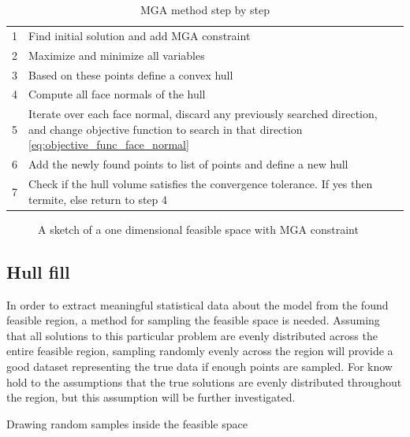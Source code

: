 \begin{table}[h]
	\caption{MGA method step by step}
	\label{tab:MGA_steps}
	\begin{tabular}{ll}
		1 & Find initial solution and add MGA constraint \\
		2 & Maximize and minimize all variables \\
		3 & Based on these points define a convex hull \\
		4 & Compute all face normals of the hull \\
		5 &  Iterate over each face normal, discard any previously searched direction, and change objective function to search in that direction \vref{eq:objective_func_face_normal} \\
		6 & Add the newly found points to list of points and define a new hull \\
		7 & Check if the hull volume satisfies the convergence tolerance. If yes then termite, else return to step 4 \\
	\end{tabular}
\end{table}


\begin{figure}[]
	\centering
	\caption{A sketch of a one dimensional feasible space with MGA constraint }
	\label{fig:step_by_step}
	\clearpage
\end{figure}





\subsection{Hull fill}

In order to extract meaningful statistical data about the model from the found feasible region, a method for sampling the feasible space is needed. Assuming that all solutions to this particular problem are evenly distributed across the entire feasible region, sampling randomly evenly across the region will provide a good dataset representing the true data if enough points are sampled. For know hold to the assumptions that the true solutions are evenly distributed throughout the region, but this assumption will be further investigated. 

Drawing random samples inside the feasible space 




